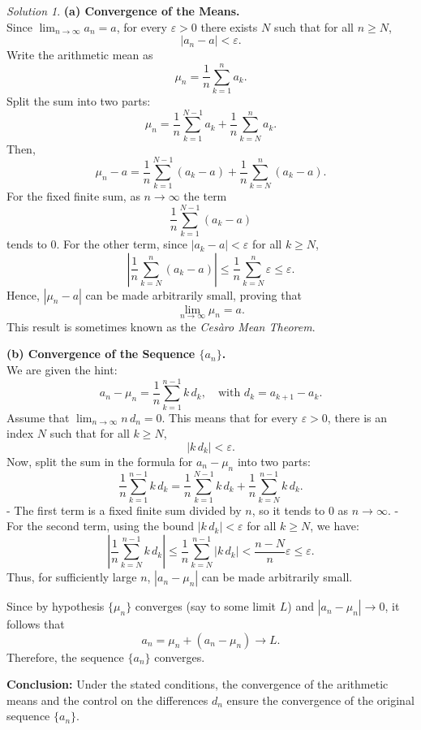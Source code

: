 \documentclass[12pt,oneside]{article}
\theoremstyle{definition}
\theoremstyle{remark}
\newtheorem*{solution}{Solution}
\begin{document}
\begin{solution}
\textbf{(a) Convergence of the Means.}\\[1mm]
Since \(\lim_{n\to\infty} a_n = a\), for every \(\varepsilon > 0\) there exists \(N\) such that for all \(n\geq N\),
\[
|a_n - a| < \varepsilon.
\]
Write the arithmetic mean as
\[
\mu_n = \frac{1}{n}\sum_{k=1}^{n} a_k.
\]
Split the sum into two parts:
\[
\mu_n = \frac{1}{n}\sum_{k=1}^{N-1} a_k + \frac{1}{n}\sum_{k=N}^{n} a_k.
\]
Then,
\[
\mu_n - a = \frac{1}{n}\sum_{k=1}^{N-1} (a_k - a) + \frac{1}{n}\sum_{k=N}^{n} (a_k - a).
\]
For the fixed finite sum, as \(n\to\infty\) the term
\[
\frac{1}{n}\sum_{k=1}^{N-1} (a_k - a)
\]
tends to 0. For the other term, since \(|a_k - a| < \varepsilon\) for all \(k\ge N\),
\[
\left|\frac{1}{n}\sum_{k=N}^{n} (a_k - a)\right| \le \frac{1}{n}\sum_{k=N}^{n} \varepsilon \le \varepsilon.
\]
Hence, \(|\mu_n-a|\) can be made arbitrarily small, proving that
\[
\lim_{n\rightarrow \infty} \mu_n = a.
\]
This result is sometimes known as the \emph{Ces\`aro Mean Theorem}.

\medskip
\textbf{(b) Convergence of the Sequence \(\{a_n\}\).}\\[1mm]
We are given the hint:
\[
a_n - \mu_n = \frac{1}{n}\sum_{k=1}^{n-1} k\, d_k, \quad \text{with } d_k = a_{k+1} - a_k.
\]
Assume that \(\lim_{n\to\infty} n\, d_n = 0\). This means that for every \(\varepsilon>0\), there is an index \(N\) such that for all \(k\ge N\),
\[
|k\,d_k| < \varepsilon.
\]
Now, split the sum in the formula for \(a_n - \mu_n\) into two parts:
\[
\frac{1}{n}\sum_{k=1}^{n-1} k\, d_k = \frac{1}{n}\sum_{k=1}^{N-1} k\, d_k + \frac{1}{n}\sum_{k=N}^{n-1} k\, d_k.
\]
- The first term is a fixed finite sum divided by \(n\), so it tends to 0 as \(n\to\infty\).  
- For the second term, using the bound \(|k\,d_k| < \varepsilon\) for all \(k\ge N\), we have:
\[
\left|\frac{1}{n}\sum_{k=N}^{n-1} k\, d_k\right| \le \frac{1}{n}\sum_{k=N}^{n-1} |k\,d_k| < \frac{n-N}{n}\varepsilon \le \varepsilon.
\]
Thus, for sufficiently large \(n\), \(|a_n - \mu_n|\) can be made arbitrarily small.

Since by hypothesis \(\{\mu_n\}\) converges (say to some limit \(L\)) and \(|a_n - \mu_n|\to 0\), it follows that
\[
a_n = \mu_n + (a_n - \mu_n) \to L.
\]
Therefore, the sequence \(\{a_n\}\) converges.

\medskip
\textbf{Conclusion:} Under the stated conditions, the convergence of the arithmetic means and the control on the differences \(d_n\) ensure the convergence of the original sequence \(\{a_n\}\).
\end{solution}
\end{document}
